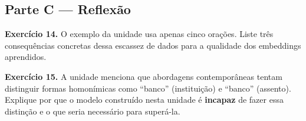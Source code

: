 \documentclass[
  brazilian,
]{article}
\begin{document}
\hypertarget{parte-c-reflexuxe3o}{%
\subsection{Parte C --- Reflexão}\label{parte-c-reflexuxe3o}}

\textbf{Exercício 14.} O exemplo da unidade usa apenas cinco orações.
Liste três consequências concretas dessa escassez de dados para a
qualidade dos embeddings aprendidos.

\textbf{Exercício 15.} A unidade menciona que abordagens contemporâneas
tentam distinguir formas homonímicas como ``banco'' (instituição) e
``banco'' (assento). Explique por que o modelo construído nesta unidade
é \textbf{incapaz} de fazer essa distinção e o que seria necessário para
superá-la.
\end{document}

